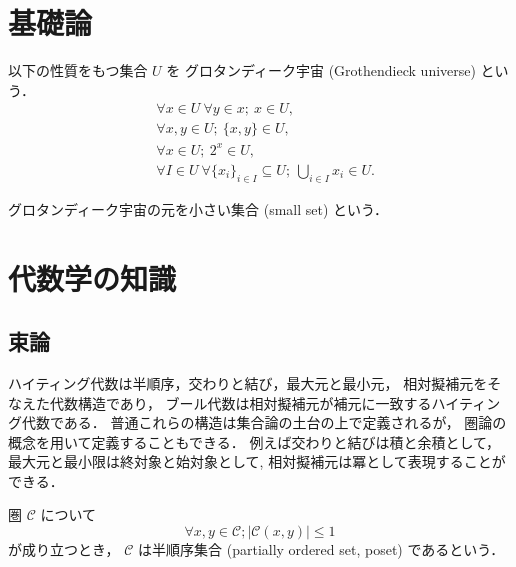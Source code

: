 \documentclass[titlepage]{ltjsreport}
\newcommand{\cat}[1]{\mathscr{#1}}
\newcommand{\objs}[1]{#1}
\newcommand{\mrps}[3]{#1(#2,#3)}
\begin{document}



\appendix

\chapter{基礎論}

\begin{definition}[グロタンディーク宇宙]
  \def\U{U}%
  \def\x{x}%
  \def\y{y}%
  以下の性質をもつ集合 $\U$ を
  グロタンディーク宇宙 (Grothendieck universe) という．
  \begin{align}
     & \forall\x\in\U\ \forall\y\in\x;\ \x\in\U,              \\
     & \forall\x,\y\in\U;\ \{\x,\y\}\in\U,                    \\
     & \forall\x\in\U;\ 2^\x\in\U,                            \\
     & \forall I\in\U\ \forall{\{\x_i\}}_{i\in I}\subseteq\U;
    \ \bigcup_{i\in I}\x_i\in\U.
  \end{align}
\end{definition}

\begin{definition}[小さい集合]\label{def:small-set}
  グロタンディーク宇宙の元を小さい集合 (small set) という．
\end{definition}

\chapter{代数学の知識}

\section{束論}

ハイティング代数は半順序，交わりと結び，最大元と最小元，
相対擬補元をそなえた代数構造であり，
ブール代数は相対擬補元が補元に一致するハイティング代数である．
普通これらの構造は集合論の土台の上で定義されるが，
圏論の概念を用いて定義することもできる．
例えば交わりと結びは積と余積として，最大元と最小限は終対象と始対象として,
相対擬補元は冪として表現することができる．

\begin{definition}[半順序集合]
  圏 $\cat{C}$ について
  \begin{equation}
    \forall x,y\in\objs{\cat{C}};|\mrps{\cat{C}}{x}{y}|\le1
  \end{equation}
  が成り立つとき，
  $\cat{C}$ は半順序集合 (partially ordered set, poset)
  であるという．
\end{definition}
\end{document}
